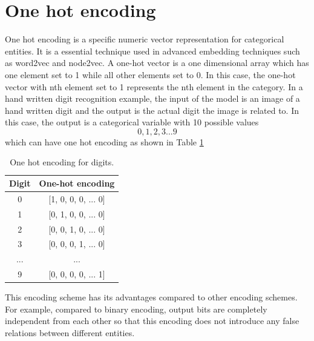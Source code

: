 \documentclass[12pt]{WSUThesis}
\theoremstyle{definition}
\begin{document}
\section{One hot encoding}
One hot encoding is a specific numeric vector representation for categorical entities.
It is a essential technique used in advanced embedding techniques such as word2vec and node2vec.
A one-hot vector is a one dimensional array which has one element set to 1 while all other elements set to 0.
In this case, the one-hot vector with nth element set to 1 represents the nth element in the category.
In a hand written digit recognition example, the input of the model is an image of a hand written digit and the output is the actual digit the image is related to.
In this case, the output is a categorical variable with 10 possible values
\[0, 1, 2, 3 ... 9\]
which can have one hot encoding as shown in Table \ref{tab:one-hot-encoding}
\begin{table}[ht]\centering
	\caption{One hot encoding for digits.}
	\begin{tabular}{cc} \hline \rowcolor{blue!30}
		Digit & One-hot encoding \\ \hline
		0 & [1, 0, 0, 0, ... 0]       \\ \hline
		1 & [0, 1, 0, 0, ... 0]       \\ \hline
		2 & [0, 0, 1, 0, ... 0]       \\ \hline
		3 & [0, 0, 0, 1, ... 0]       \\ \hline
		... & ...       \\ \hline
		9 & [0, 0, 0, 0, ... 1]       \\ \hline
	\end{tabular}
	\label{tab:one-hot-encoding}
\end{table}
This encoding scheme has its advantages compared to other encoding schemes.
For example, compared to binary encoding, output bits are completely independent from each other
so that this encoding does not introduce any false relations between different entities.
\end{document}

